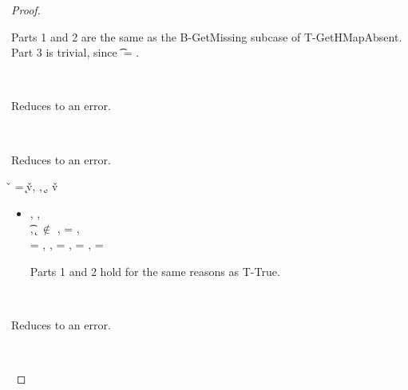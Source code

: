 \begin{lemma}
\begin{proof}
\begin{case}[B-GetMissing]
\begin{itemize}
\begin{subcase}[T-GetHMapPartialDefault]
         Parts 1 and 2 are the same as the B-GetMissing subcase of T-GetHMapAbsent.
         Part 3 is trivial, since \t{} = \Top.
      \end{subcase}
  \end{itemize}
\end{case}

\begin{case}[BE-Get1]
  \ 

  Reduces to an error.
\end{case}

\begin{case}[BE-Get2]
  \ 

  Reduces to an error.
\end{case}

\begin{case}[B-Assoc]
        \v{} = 
        {
                {\k{}}{\v{v}}},
        \opsem {\openv{}}
        {} {},
        \opsem {\openv{}} {} {\k{}},
        \opsem {\openv{}} {} {\v{v}}

  \begin{itemize}
    \item[]
      \begin{subcase}[T-AssocHMap]
  \judgementtworewrite {\propenv{}} {} {\HMapgeneric {\mandatory{}} {\absent}} {},
  \judgementtworewrite {\propenv{}} {} {\Value{\k{}}}{},\\
  \judgementtworewrite {\propenv{}} {} {\t{}}{},
  {\k{}} $\not\in$ {\absent{}},
  \ep{} = { {} {}},\\
  \e{} = { {} {}},
  \issubtypein{}{\HMapgeneric {\extendmandatoryset {\mandatory{}}{\k{}}{\t{}}} {\absent}}{\t{}},
  \thenprop{\prop{}} = {\topprop{}},
  \elseprop{\prop{}} = {\botprop{}},
  \object{} = \emptyobject{}

        Parts 1 and 2 hold for the same reasons as T-True.
      \end{subcase}
  \end{itemize}
\end{case}

\begin{case}[BE-Assoc1]
  \ 

  Reduces to an error.
\end{case}

\begin{case}[BE-Assoc2]
  \ 


\end{case}
\end{proof}
\end{lemma}
